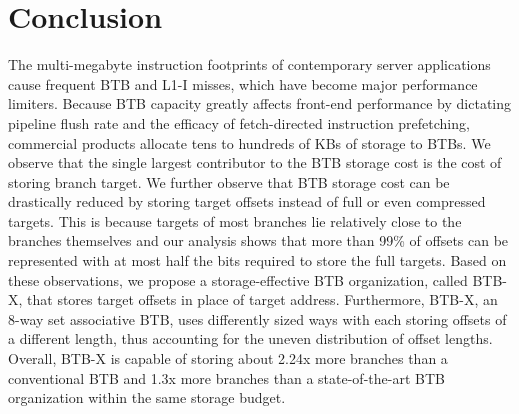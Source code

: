 \section{Conclusion}
\label{sec:concl}

The multi-megabyte instruction footprints of contemporary server applications cause frequent BTB and L1-I misses, which have become major performance limiters. Because BTB capacity greatly affects front-end performance by dictating pipeline flush rate and the efficacy of fetch-directed instruction prefetching, commercial products allocate tens to hundreds of KBs of storage to BTBs. We observe that the single largest contributor to the BTB storage cost is the cost of storing branch target. We further observe that BTB storage cost can be drastically reduced by storing target offsets instead of full or even compressed targets. This is because targets of most branches lie relatively close to the branches themselves and our analysis shows that more than 99\% of offsets can be represented with at most half the bits required to store the full targets. Based on these observations, we propose a storage-effective BTB organization, called BTB-X, that stores target offsets in place of target address. Furthermore, BTB-X, an 8-way set associative BTB, uses differently sized ways with each storing offsets of a different length, thus accounting for the uneven distribution of offset lengths. Overall, BTB-X is capable of storing about 2.24x more branches than a conventional BTB and 1.3x more branches than a state-of-the-art BTB organization within the same storage budget.